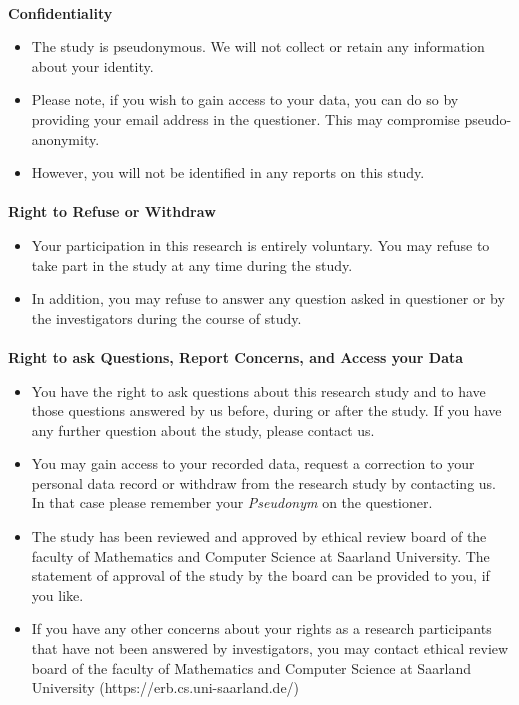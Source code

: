 \documentclass[12pt,fleqn]{scrreprt}
\begin{document}
\paragraph{}
{\large \bf Confidentiality}
\begin{itemize}
    \item The study is pseudonymous. We will not collect or retain any information about your identity. 
    \item Please note, if you wish to gain access to your data, you can do so by providing your email address in the questioner. This may compromise pseudo-anonymity. 
    \item However, you will not be identified in any reports on this study.
\end{itemize}

\paragraph{}
{\large \bf Right to Refuse or Withdraw}
\begin{itemize}
    \item Your participation in this research is entirely voluntary. You may refuse to take part in the study at any time during the study.
    \item In addition, you may refuse to answer any question asked in questioner or by the investigators during the course of study.
\end{itemize}

\paragraph{}
{\large \bf Right to ask Questions, Report Concerns, and Access your Data}
\begin{itemize}
    \item You have the right to ask questions about this research study and to have those questions answered by us before, during or after the study. If you have any further question about the study, please contact us.
    \item You may gain access to your recorded data, request a correction to your personal data record or withdraw from the research study by contacting us. In that case please remember your \textit{Pseudonym} on the questioner. 
    \item The study has been reviewed and approved by ethical review board of the faculty of Mathematics and Computer Science at Saarland University. The statement of approval of the study by the board can be provided to you, if you like.
    \item If you have any other concerns about your rights as a research participants that have not been answered by investigators, you may contact ethical review board of the faculty of Mathematics and Computer Science at Saarland University (https://erb.cs.uni-saarland.de/)
\end{itemize}
\end{document}
